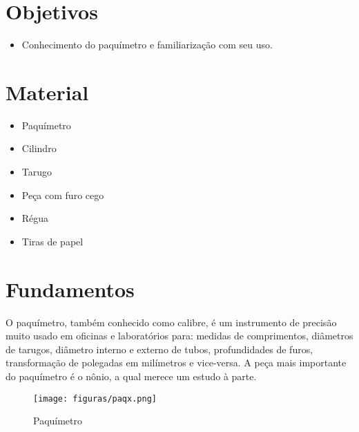 
\section{Objetivos}

\begin{itemize}
\item Conhecimento do paquímetro e familiarização com seu uso.
\end{itemize}

\section{Material}

\begin{multicols}{3}
\begin{itemize}
\item Paquímetro
\item Cilindro
\item Tarugo
\item Peça com furo cego
\item Régua
\item Tiras de papel
\end{itemize}
\end{multicols}

\section{Fundamentos}
O paquímetro, também conhecido como calibre, é um instrumento de precisão muito usado em oficinas e laboratórios para: medidas de comprimentos, diâmetros de tarugos, diâmetro interno e externo de tubos, profundidades de furos, transformação de polegadas em milímetros e vice-versa. A peça mais importante do paquímetro é o nônio, a qual merece um estudo à parte.

\begin{figure}[ht]
\centering
\label{fig:paq}
\texttt{[image: figuras/paqx.png]} 
\caption{Paquímetro}
\end{figure}

